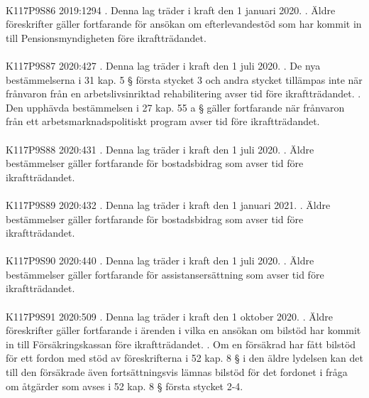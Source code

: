\documentclass[a4paper,notitlepage,openany,10pt]{book}
\begin{document}
\paragraph*{}
{\tiny K117P9S86}
2019:1294
. Denna lag träder i kraft den 1 januari 2020.
. Äldre föreskrifter gäller fortfarande för ansökan om efterlevandestöd som har kommit in till Pensionsmyndigheten före ikraftträdandet.
\paragraph*{}
{\tiny K117P9S87}
2020:427
. Denna lag träder i kraft den 1 juli 2020.
. De nya bestämmelserna i 31 kap. 5 § första stycket 3 och andra stycket tillämpas inte när frånvaron från en arbetslivsinriktad rehabilitering avser tid före ikraftträdandet.
. Den upphävda bestämmelsen i 27 kap. 55 a § gäller fortfarande när frånvaron från ett arbetsmarknadspolitiskt program avser tid före ikraftträdandet.
\paragraph*{}
{\tiny K117P9S88}
2020:431
. Denna lag träder i kraft den 1 juli 2020.
. Äldre bestämmelser gäller fortfarande för bostadsbidrag som avser tid före ikraftträdandet.
\paragraph*{}
{\tiny K117P9S89}
2020:432
. Denna lag träder i kraft den 1 januari 2021.
. Äldre bestämmelser gäller fortfarande för bostadsbidrag som avser tid före ikraftträdandet.
\paragraph*{}
{\tiny K117P9S90}
2020:440
. Denna lag träder i kraft den 1 juli 2020.
. Äldre bestämmelser gäller fortfarande för assistansersättning som avser tid före ikraftträdandet.
\paragraph*{}
{\tiny K117P9S91}
2020:509
. Denna lag träder i kraft den 1 oktober 2020.
. Äldre föreskrifter gäller fortfarande i ärenden i vilka en ansökan om bilstöd har kommit in till Försäkringskassan före ikraftträdandet.
. Om en försäkrad har fått bilstöd för ett fordon med stöd av föreskrifterna i 52 kap. 8 § i den äldre lydelsen kan det till den försäkrade även fortsättningsvis lämnas bilstöd för det fordonet i fråga om åtgärder som avses i 52 kap. 8 § första stycket 2-4.
\end{document}
